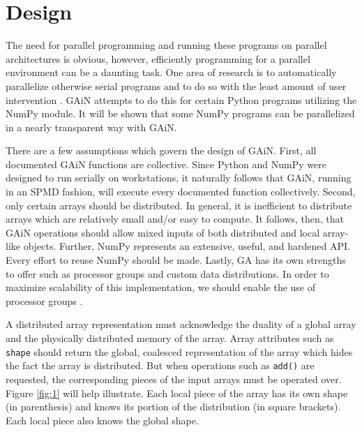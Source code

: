 \documentclass{sigplanconf}
\begin{document}
\section{Design}

The need for parallel programming and running these programs on parallel
architectures is obvious, however, efficiently programming for a parallel
environment can be a daunting task. One area of research is to automatically
parallelize otherwise serial programs and to do so with the least amount of
user intervention \cite{Buy99}. GAiN attempts to do this for certain Python
programs utilizing the NumPy module. It will be shown that some NumPy programs
can be parallelized in a nearly transparent way with GAiN.

There are a few assumptions which govern the design of GAiN. First, all
documented GAiN functions are collective. Since Python and NumPy were designed
to run serially on workstations, it naturally follows that GAiN, running in an
SPMD fashion, will execute every documented function collectively. Second,
only certain arrays should be distributed. In general, it is inefficient to
distribute arrays which are relatively small and/or easy to compute. It
follows, then, that GAiN operations should allow mixed inputs of both
distributed and local array-like objects. Further, NumPy represents an
extensive, useful, and hardened API. Every effort to reuse NumPy should be
made. Lastly, GA has its own strengths to offer such as processor groups and
custom data distributions. In order to maximize scalability of this
implementation, we should enable the use of processor groups \cite{Nie05}.

A distributed array representation must acknowledge the duality of a global
array and the physically distributed memory of the array. Array attributes
such as \verb=shape= should return the global, coalesced representation of the
array which hides the fact the array is distributed. But when operations such
as \verb=add()= are requested, the corresponding pieces of the input arrays
must be operated over. Figure \ref{fig:1} will help illustrate.  Each local
piece of the array has its own shape (in parenthesis) and knows its portion of
the distribution (in square brackets). Each local piece also knows the global
shape.
\end{document}
